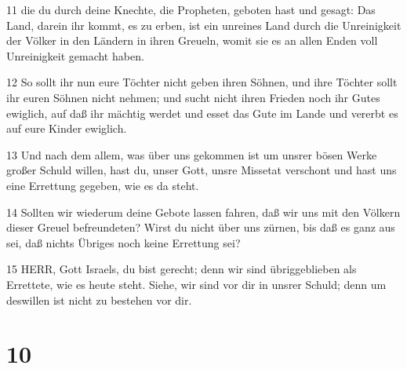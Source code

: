 \par 11 die du durch deine Knechte, die Propheten, geboten hast und gesagt: Das Land, darein ihr kommt, es zu erben, ist ein unreines Land durch die Unreinigkeit der Völker in den Ländern in ihren Greueln, womit sie es an allen Enden voll Unreinigkeit gemacht haben.
\par 12 So sollt ihr nun eure Töchter nicht geben ihren Söhnen, und ihre Töchter sollt ihr euren Söhnen nicht nehmen; und sucht nicht ihren Frieden noch ihr Gutes ewiglich, auf daß ihr mächtig werdet und esset das Gute im Lande und vererbt es auf eure Kinder ewiglich.
\par 13 Und nach dem allem, was über uns gekommen ist um unsrer bösen Werke großer Schuld willen, hast du, unser Gott, unsre Missetat verschont und hast uns eine Errettung gegeben, wie es da steht.
\par 14 Sollten wir wiederum deine Gebote lassen fahren, daß wir uns mit den Völkern dieser Greuel befreundeten? Wirst du nicht über uns zürnen, bis daß es ganz aus sei, daß nichts Übriges noch keine Errettung sei?
\par 15 HERR, Gott Israels, du bist gerecht; denn wir sind übriggeblieben als Errettete, wie es heute steht. Siehe, wir sind vor dir in unsrer Schuld; denn um deswillen ist nicht zu bestehen vor dir.

\chapter{10}

